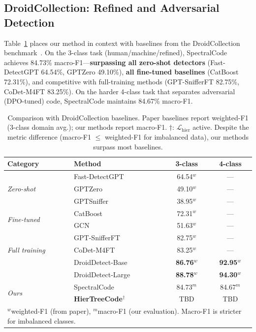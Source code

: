 \documentclass{article}
\begin{document}
\subsection{DroidCollection: Refined and Adversarial Detection}

Table~\ref{tab:droid_compare} places our method in context with baselines from the DroidCollection benchmark~\citep{droid2025}. On the 3-class task (human/machine/refined), SpectralCode achieves 84.73\% macro-F1---\textbf{surpassing all zero-shot detectors} (Fast-DetectGPT 64.54\%, GPTZero 49.10\%), \textbf{all fine-tuned baselines} (CatBoost 72.31\%), and competitive with full-training methods (GPT-SnifferFT 82.75\%, CoDet-M4FT 83.25\%). On the harder 4-class task that separates adversarial (DPO-tuned) code, SpectralCode maintains 84.67\% macro-F1.

\begin{table}[t]
\caption{Comparison with DroidCollection baselines. Paper baselines report weighted-F1 (3-class domain avg.); our methods report macro-F1. $\dagger$: $\mathcal{L}_{\text{hier}}$ active. Despite the metric difference (macro-F1 $\leq$ weighted-F1 for imbalanced data), our methods surpass most baselines.}
\label{tab:droid_compare}
\centering
\small
\begin{tabular}{llcc}
\toprule
\textbf{Category} & \textbf{Method} & \textbf{3-class} & \textbf{4-class} \\
\midrule
\multirow{3}{*}{\textit{Zero-shot}} & Fast-DetectGPT & 64.54$^w$ & --- \\
& GPTZero & 49.10$^w$ & --- \\
& GPTSniffer & 38.95$^w$ & --- \\
\midrule
\multirow{2}{*}{\textit{Fine-tuned}} & CatBoost & 72.31$^w$ & --- \\
& GCN & 51.63$^w$ & --- \\
\midrule
\multirow{3}{*}{\textit{Full training}} & GPT-SnifferFT & 82.75$^w$ & --- \\
& CoDet-M4FT & 83.25$^w$ & --- \\
& DroidDetect-Base & \textbf{86.76}$^w$ & \textbf{92.95}$^w$ \\
& DroidDetect-Large & \textbf{88.78}$^w$ & \textbf{94.30}$^w$ \\
\midrule
\multirow{2}{*}{\textit{Ours}} & SpectralCode & 84.73$^m$ & 84.67$^m$ \\
\rowcolor{ours}
& \textbf{HierTreeCode}$^\dagger$ & TBD & TBD \\
\bottomrule
\multicolumn{4}{l}{\scriptsize $^w$weighted-F1 (from paper), $^m$macro-F1 (our evaluation). Macro-F1 is stricter for imbalanced classes.}
\end{tabular}
\end{table}
\end{document}
